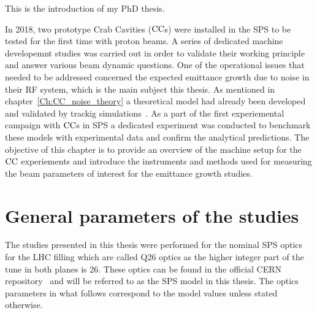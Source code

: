 This is the introduction of my PhD thesis.
\newpage

 In 2018, two prototype Crab Cavities (${\mathrm{CC}}$s) were installed in the SPS to be tested for the first time with proton beams. A series of dedicated machine developemnt studies was carried out in order to validate their working principle and answer various beam dynamic questions. One of the operational issues that needed to be addressed concerned the expected emittance growth due to noise in their RF system, which is the main subject this thesis.  As mentioned in chapter~\ref{Ch:CC_noise_theory} a theoretical model had already been developed and validated by trackig simulations~\cite{PhysRevSTAB.18.101001}. 
 As a part of the first experiemental campaign with ${\mathrm{CC}}$s in SPS a dedicated experiment was conducted to benchmark these models with experimental data and confirm the analytical predictions. The objective of this chapter is to provide an overview of the machine setup for the ${\mathrm{CC}}$ experiements and introduce the instruments and methods used for measuring the beam parameters of interest for the emittance growth studies.
 

 \section{General parameters of the studies}
 The studies presented in this thesis were performed for the nominal SPS optics for the LHC filling which are called Q26 optics as the higher integer part of the tune in both planes is 26. These optics can be found in the official CERN repository~\cite{SPS_optics_repo} and will be referred to as the SPS model in this thesis. The optics parameters in what follows correspond to the model values unless stated otherwise.





 